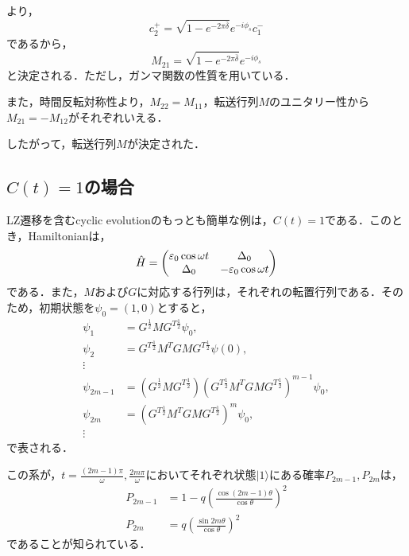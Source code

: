\documentclass[a4paper, titlepage]{jsreport}
\begin{document}
より，
\begin{equation}
  c_2^+ = \sqrt{1 - e^{-2\pi \bar{\delta}}} e^{-i\phi_s} c_1^-
\end{equation}
であるから，
\begin{equation}
  M_{21} = \sqrt{1 - e^{-2\pi \bar{\delta}}} e^{-i\phi_s}
\end{equation}
と決定される．ただし，ガンマ関数の性質を用いている．


また，時間反転対称性より，$M_{22} = M_{11}$，転送行列$M$のユニタリー性から$M_{21} = -M_{12}$がそれぞれいえる．


したがって，転送行列$M$が決定された．

\subsection{$C(t) =1$の場合}
LZ遷移を含むcyclic evolutionのもっとも簡単な例は，$C(t) =1$である\cite{Kayanuma1994}．このとき，Hamiltonianは，
\begin{equation}
  \Hat{H} =
  \begin{pmatrix}
    \varepsilon_0 \cos \omega t & \Delta_0\\
    \Delta_0 & -\varepsilon_0 \cos \omega t
  \end{pmatrix} 
\end{equation}
である．また，$M$および$G$に対応する行列は，それぞれの転置行列である．そのため，初期状態を$\psi_0 = (1,0)$とすると，
\begin{align}
  \psi_1 &= G^{\frac{1}{2}} M G^{T \frac{1}{2}} \psi_0,\\
  \psi_2 &=  G^{T \frac{1}{2}} M^T G M G^{T \frac{1}{2}} \psi(0),\\
  \vdots\\
  \psi_{2m-1} &= (G^{\frac{1}{2}} M G^{T \frac{1}{2}}) (G^{T \frac{1}{2}} M^T G M G^{T \frac{1}{2}})^{m-1} \psi_0,\\
  \psi_{2m} &= (G^{T \frac{1}{2}} M^T G M G^{T \frac{1}{2}})^{m} \psi_0,\\
  \vdots
\end{align}
で表される．


この系が，$t = \frac{(2m-1)\pi}{\omega}, \frac{2m \pi}{\omega}$においてそれぞれ状態$|1\rangle$にある確率$P_{2m-1}, P_{2m}$は，
\begin{align}
  P_{2m-1} &= 1 - q \left( \frac{\cos(2m-1) \theta}{\cos\theta} \right)^2\\
  P_{2m} &= q \left( \frac{\sin 2m \theta}{\cos\theta} \right)^2
\end{align}
であることが知られている\cite{Kayanuma1994}．
\end{document}
